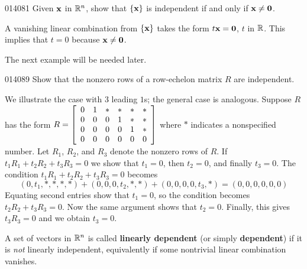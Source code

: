 \begin{example}{}{014081}
Given $\textbf{x}$ in $\mathbb{R}^n$, show that $\{\textbf{x}\}$ is independent if and only if $\textbf{x} \neq \textbf{0}$.

\begin{solution}
  A vanishing linear combination from $\{\textbf{x}\}$ takes the form $t\textbf{x} = \textbf{0}$, $t$ in $\mathbb{R}$. This implies that $t = 0$ because $\textbf{x} \neq \textbf{0}$.
\end{solution}
\end{example}

\noindent The next example will be needed later.


\begin{example}{}{014089}
Show that the nonzero rows of a row-echelon matrix $R$ are independent.

\begin{solution}
  We illustrate the case with 3 leading $1$s; the general case is analogous. Suppose $R$ has the form 
$R = 
\left[ \begin{array}{rrrrrr}
	0 & 1 & * & * & * & * \\
	0 & 0 & 0 & 1 & * & * \\
	0 & 0 & 0 & 0 & 1 & * \\
	0 & 0 & 0 & 0 & 0 & 0 \\
\end{array} \right]$
 where $*$ indicates a nonspecified number. Let $R_{1}$, $R_{2}$, and $R_{3}$ denote the nonzero rows of $R$. If $t_{1}R_{1} + t_{2}R_{2} + t_{3}R_{3} = 0$ we show that $t_{1} = 0$, then $t_{2} = 0$, and finally $t_{3} = 0$. The condition $t_{1}R_{1} + t_{2}R_{2} + t_{3}R_{3} = 0$ becomes
\begin{equation*}
(0, t_1, *, *, *, *) + (0, 0, 0, t_2, *, *) + (0, 0, 0, 0, t_3, *) = (0, 0, 0, 0, 0, 0)
\end{equation*}
Equating second entries show that $t_{1} = 0$, so the condition becomes $t_{2}R_{2} + t_{3}R_{3} = 0$. Now the same argument shows that $t_{2} = 0$. Finally, this gives $t_{3}R_{3} = 0$ and we obtain $t_{3} = 0$.
\end{solution}
\end{example}

A set of vectors in $\mathbb{R}^n$ is called \textbf{linearly dependent} (or simply \textbf{dependent}) if it is \textit{not} linearly independent, equivalently if some nontrivial linear combination vanishes.

